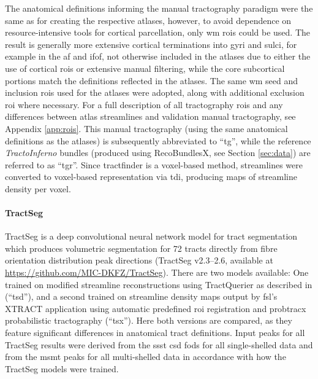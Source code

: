 \documentclass[12pt,phd,a4paper,twoside]{ucl_thesis}
\renewcommand{\textcite}[2][]{
\ifthenelse { \equal {#1} {} }  {\citeauthor{#2}\autocite{#2}}   {\citeauthor{#1}\autocite{#2}}}
\begin{document}
The anatomical definitions informing the manual tractography paradigm were the same as for creating the respective atlases, however, to avoid dependence on resource-intensive tools for cortical parcellation, only \gls{wm} \glspl{roi} could be used.
The result is generally more extensive cortical terminations into gyri and sulci, for example in the \gls{af} and \gls{ifof}, not otherwise included in the atlases due to either the use of cortical \glspl{roi} or extensive manual filtering, while the core subcortical portions match the definitions reflected in the atlases.
The same \gls{wm} seed and inclusion \glspl{roi} used for the atlases were adopted, along with additional exclusion \gls{roi} where necessary.
For a full description of all tractography \glspl{roi} and any differences between atlas streamlines and validation manual tractography, see Appendix \ref{app:rois}.
This manual tractography (using the same anatomical definitions as the atlases) is subsequently abbreviated to ``\gls{tg}'', while the reference \textit{TractoInferno} bundles (produced using RecoBundlesX, see Section \ref{sec:data}) are referred to as ``\gls{tgr}''.
Since tractfinder is a voxel-based method, streamlines were converted to voxel-based representation via \gls{tdi}\autocite{Calamante2010}, producing maps of streamline density per voxel.

\paragraph*{TractSeg}

TractSeg \autocite{Wasserthal2018} is a deep convolutional neural network model for tract segmentation which produces volumetric segmentation for 72 tracts directly from fibre orientation distribution peak directions (TractSeg v2.3--2.6, available at \url{https://github.com/MIC-DKFZ/TractSeg}).
There are two models available: One trained on modified streamline reconstructions using TractQuerier \autocite{Wassermann2016} as described in \textcite{Wasserthal2018} (``\gls{tsd}''), and a second trained on streamline density maps output by \gls{fsl}'s XTRACT \autocite{Warrington2020} application using automatic predefined \gls{roi} registration and probtracx probabilistic tractography\autocite{Behrens2007} (``\gls{tsx}'').
Here both versions are compared, as they feature significant differences in anatomical tract definitions.
Input peaks for all TractSeg results were derived from the \gls{ssst} \gls{csd} \glspl{fod} for all single-shelled data and from the \gls{msmt} peaks for all multi-shelled data in accordance with how the TractSeg models were trained.
\end{document}
